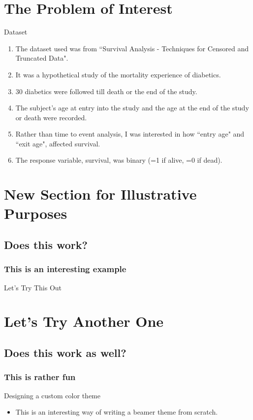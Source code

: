 \section{The Problem of Interest}
\begin{frame}{Dataset}
\begin{enumerate}
\item{The dataset used was from ``Survival Analysis - Techniques for Censored and Truncated Data".} 
\item{It was a hypothetical study of the mortality experience of diabetics.}
\item{30 diabetics were followed till death or the end of the study.}
\item{The subject's age at entry into the study and the age at the end of the study or death were recorded.}
\item{Rather than time to event analysis, I was interested in how ``entry age" and ``exit age", affected survival.} 
\item{\alert{The response variable, survival, was binary (=1 if alive, =0 if dead).}}
\end{enumerate}
\end{frame}

\section{New Section for Illustrative Purposes}
\subsection{Does this work?}
\subsubsection{This is an interesting example}
\begin{frame}{Let's Try This Out}
\end{frame}

\section{Let's Try Another One}
\subsection{Does this work as well?}
\subsubsection{This is rather fun}
\begin{frame}{Designing a custom color theme}
\begin{itemize}
\item{This is an interesting way of writing a beamer theme from scratch.}
\end{itemize}
\end{frame}


